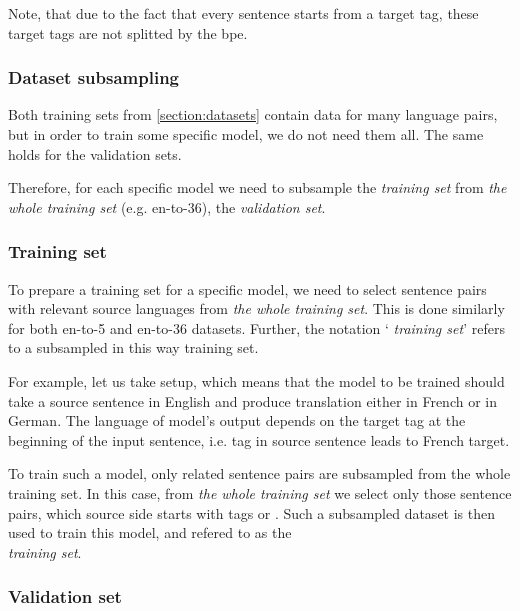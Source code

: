 Note, that due to the fact that every sentence starts from a
target tag, these target tags are not splitted by the \acrshort{bpe}.

\subsubsection*{Dataset subsampling}

Both training sets from \cref{section:datasets} contain data for
many language pairs, but in order to train some specific model,
we do not need them all.
The same holds for the validation sets.

Therefore, for each specific model 
we need to subsample the \emph{ training set}
from \emph{the whole training set} (e.g. \gls{en-to-36}),
the \emph{ validation set}.



\subsubsection*{Training set}

To prepare a training set for a specific model, we need to select
sentence pairs with relevant source languages from
\emph{the whole training set}.
This is done similarly for both \gls{en-to-5} and \gls{en-to-36}
datasets.
Further, the notation `\emph{ training set}'
refers to a subsampled in this way training set.

For example, let us take  setup, which means that
the model to be trained should take a source sentence in English and
produce translation either in French or in German.
The language of model's output depends on the target tag at the beginning
of the input sentence, i.e.  tag in source sentence leads to French
target.

To train such a model, only related sentence pairs are subsampled
from the whole training set.
In this case, from \emph{the whole training set} we select only those sentence
pairs, which source side starts with tags  or .
Such a subsampled dataset is then used to train this model, and refered to 
as the \\ \emph{ training set}.


\subsubsection*{Validation set}

